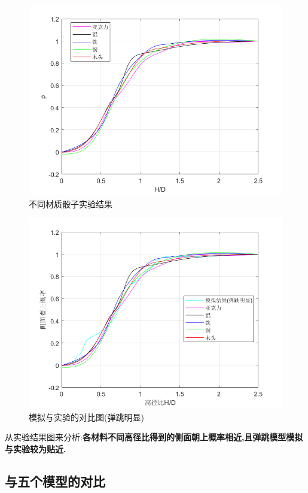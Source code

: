 \documentclass[UTF8]{gapd}
\begin{document}
\begin{figure}[h]%
	\centering
	\includegraphics[width=1\columnwidth]{images/不同材质}
	\caption{不同材质骰子实验结果}
	\label{fig:P2}%
\end{figure}
\begin{figure}[h]%
	\centering
	\includegraphics[width=1\columnwidth]{images/模拟(弹跳)}
	\caption{模拟与实验的对比图(弹跳明显)}
	\label{fig:P2}%
\end{figure}

从实验结果图来分析:\textbf{各材料不同高径比得到的侧面朝上概率相近,且弹跳模型模拟与实验较为贴近.}

\subsection{与五个模型的对比}
\end{document}
